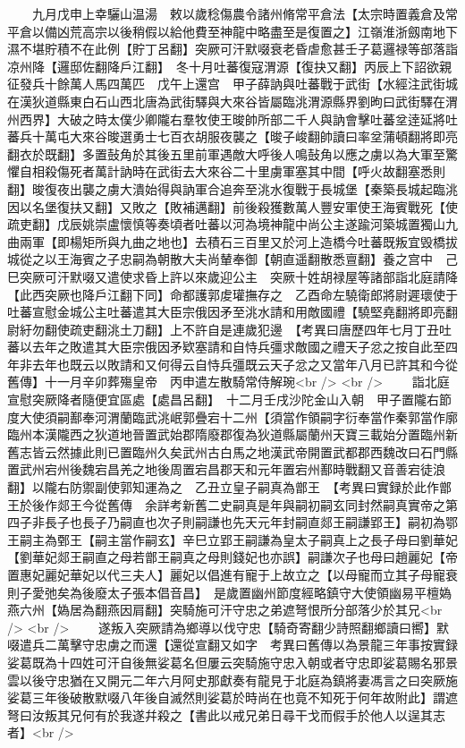 　　九月戊申上幸驪山温湯　敕以歲稔傷農令諸州脩常平倉法【太宗時置義倉及常平倉以備凶荒高宗以後稍假以給他費至神龍中略盡至是復置之】江嶺淮浙劔南地下濕不堪貯積不在此例【貯丁呂翻】突厥可汗默啜衰老昏虐愈甚壬子葛邏禄等部落詣凉州降【邏邸佐翻降戶江翻】　冬十月吐蕃復寇渭源【復抉又翻】丙辰上下詔欲親征發兵十餘萬人馬四萬匹　戊午上還宫　甲子薛訥與吐蕃戰于武街【水經注武街城在漢狄道縣東白石山西北唐為武街驛與大來谷皆屬臨洮渭源縣界劉昫曰武街驛在渭州西界】大破之時太僕少卿隴右羣牧使王晙帥所部二千人與訥會擊吐蕃坌逹延將吐蕃兵十萬屯大來谷晙選勇士七百衣胡服夜襲之【晙子峻翻帥讀曰率坌蒲頓翻將即亮翻衣於既翻】多置鼔角於其後五里前軍遇敵大呼後人鳴鼔角以應之虜以為大軍至驚懼自相殺傷死者萬計訥時在武街去大來谷二十里虜軍塞其中間【呼火故翻塞悉則翻】晙復夜出襲之虜大潰始得與訥軍合追奔至洮水復戰于長城堡【秦築長城起臨洮因以名堡復扶又翻】又敗之【敗補邁翻】前後殺獲數萬人豐安軍使王海賓戰死【使疏吏翻】戊辰姚崇盧懷慎等奏頃者吐蕃以河為境神龍中尚公主遂踰河築城置獨山九曲兩軍【即楊矩所與九曲之地也】去積石三百里又於河上造橋今吐蕃既叛宜毁橋拔城從之以王海賓之子忠嗣為朝散大夫尚輦奉御【朝直遥翻散悉亶翻】養之宫中　己巳突厥可汗默啜又遣使求昏上許以來歲迎公主　突厥十姓胡禄屋等諸部詣北庭請降【此西突厥也降戶江翻下同】命都護郭䖍瓘撫存之　乙酉命左驍衛郎將尉遲瓌使于吐蕃宣慰金城公主吐蕃遣其大臣宗俄因矛至洮水請和用敵國禮【驍堅堯翻將即亮翻尉紆勿翻使疏吏翻洮土刀翻】上不許自是連歲犯邊　【考異曰唐歷四年七月丁丑吐蕃以去年之敗遣其大臣宗俄因矛欵塞請和自恃兵彊求敵國之禮天子忿之按自此至四年非去年也既云以敗請和又何得云自恃兵彊既云天子忿之又當年八月已許其和今從舊傳】十一月辛卯葬殤皇帝　丙申遣左散騎常侍解琬<br />
<br />
　　詣北庭宣慰突厥降者隨便宜區處【處昌呂翻】　十二月壬戌沙陀金山入朝　甲子置隴右節度大使須嗣鄯奉河渭蘭臨武洮岷郭疊宕十二州【須當作領嗣字衍奉當作秦郭當作廓臨州本漢隴西之狄道地晉置武始郡隋廢郡復為狄道縣屬蘭州天寶三載始分置臨州新舊志皆云然據此則已置臨州久矣武州古白馬之地漢武帝開置武都郡西魏改曰石門縣置武州宕州後魏宕昌羌之地後周置宕昌郡天和元年置宕州鄯時戰翻又音善宕徒浪翻】以隴右防禦副使郭知運為之　乙丑立皇子嗣真為鄫王　【考異曰實録於此作鄫王於後作郯王今從舊傳　余詳考新舊二史嗣真是年與嗣初嗣玄同封然嗣真實帝之第四子非長子也長子乃嗣直也次子則嗣謙也先天元年封嗣直郯王嗣謙郢王】嗣初為鄂王嗣主為鄄王【嗣主當作嗣玄】辛巳立郢王嗣謙為皇太子嗣真上之長子母曰劉華妃【劉華妃郯王嗣直之母若鄫王嗣真之母則錢妃也亦誤】嗣謙次子也母曰趙麗妃【帝置惠妃麗妃華妃以代三夫人】麗妃以倡進有寵于上故立之【以母寵而立其子母寵衰則子愛弛矣為後廢太子張本倡音昌】　是歲置幽州節度經略鎮守大使領幽易平檀媯燕六州【媯居為翻燕因肩翻】突騎施可汗守忠之弟遮弩恨所分部落少於其兄<br />
<br />
　　遂叛入突厥請為鄉導以伐守忠【騎奇寄翻少詩照翻鄉讀曰嚮】默啜遣兵二萬擊守忠虜之而還【還從宣翻又如字　考異曰舊傳以為景龍三年事按實録娑葛既為十四姓可汗自後無娑葛名但屢云突騎施守忠入朝或者守忠即娑葛賜名邪景雲以後守忠猶在又開元二年六月阿史那獻奏有龍見于北庭為鎮將妻馮言之曰突厥施娑葛三年後破散默啜八年後自滅然則娑葛於時尚在也竟不知死于何年故附此】謂遮弩曰汝叛其兄何有於我遂幷殺之【書此以戒兄弟日尋干戈而假手於他人以逞其志者】<br />
